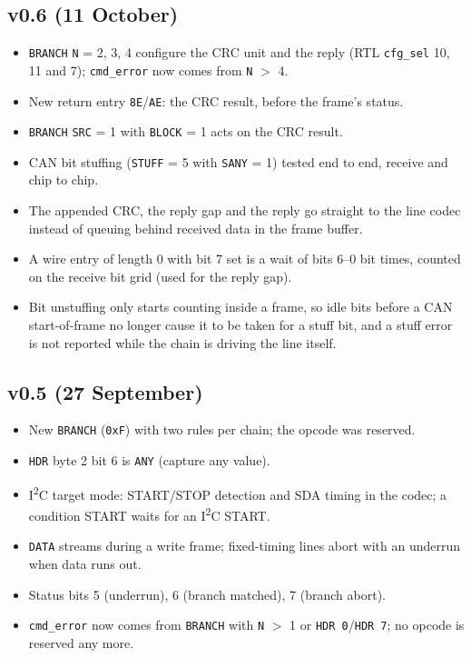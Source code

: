 \documentclass[11pt,a4paper]{article}
\newcommand{\sig}[1]{\texttt{#1}}
\begin{document}
\subsection{v0.6 (11 October)}

\begin{itemize}
\item \sig{BRANCH} \sig{N} = 2, 3, 4 configure the CRC unit and the reply (RTL \sig{cfg\_sel} 10, 11 and 7); \sig{cmd\_error} now comes from \sig{N} $>$ 4.
\item New return entry \texttt{8E}/\texttt{AE}: the CRC result, before the frame's status.
\item \sig{BRANCH} \sig{SRC} = 1 with \sig{BLOCK} = 1 acts on the CRC result.
\item CAN bit stuffing (\sig{STUFF} = 5 with \sig{SANY} = 1) tested end to end, receive and chip to chip.
\item The appended CRC, the reply gap and the reply go straight to the line codec instead of queuing behind received data in the frame buffer.
\item A wire entry of length 0 with bit 7 set is a wait of bits 6--0 bit times, counted on the receive bit grid (used for the reply gap).
\item Bit unstuffing only starts counting inside a frame, so idle bits before a CAN start-of-frame no longer cause it to be taken for a stuff bit, and a stuff error is not reported while the chain is driving the line itself.
\end{itemize}

\subsection{v0.5 (27 September)}

\begin{itemize}
\item New \sig{BRANCH} (\texttt{0xF}) with two rules per chain; the opcode was reserved.
\item \sig{HDR} byte 2 bit 6 is \sig{ANY} (capture any value).
\item I\textsuperscript{2}C target mode: START/STOP detection and SDA timing in the codec; a condition START waits for an I\textsuperscript{2}C START.
\item \sig{DATA} streams during a write frame; fixed-timing lines abort with an underrun when data runs out.
\item Status bits 5 (underrun), 6 (branch matched), 7 (branch abort).
\item \sig{cmd\_error} now comes from \sig{BRANCH} with \sig{N} $>$ 1 or \sig{HDR 0}/\sig{HDR 7}; no opcode is reserved any more.
\end{itemize}
\end{document}
